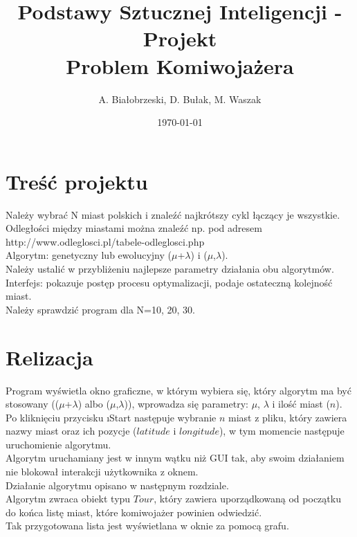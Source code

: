 \documentclass[11pt]{article}
\title{Podstawy Sztucznej Inteligencji - Projekt \\ \large Problem Komiwojażera}
\author{A. Białobrzeski, D. Bułak, M. Waszak}
\date{\today}
\begin{document}
\maketitle

\section{Treść projektu}
Należy wybrać N miast polskich i znaleźć najkrótszy cykl łączący je wszystkie.\\
Odległości między miastami można znaleźć np. pod adresem
http://www.odleglosci.pl/tabele-odleglosci.php\\
Algorytm: genetyczny lub ewolucyjny ($\mu$+$\lambda$) i ($\mu$,$\lambda$).\\Należy ustalić w przybliżeniu najlepsze parametry działania obu algorytmów.\\
Interfejs: pokazuje postęp procesu optymalizacji, podaje ostateczną kolejność miast.\\
Należy sprawdzić program dla N=10, 20, 30. 


\section{Relizacja}
Program wyświetla okno graficzne, w którym wybiera się, który algorytm ma być stosowany (($\mu$+$\lambda$) albo ($\mu$,$\lambda$)), wprowadza się parametry: $\mu$, $\lambda$ i ilość miast ($n$). Po kliknięciu przycisku \i{Start} następuje wybranie $n$ miast z pliku, który zawiera nazwy miast oraz ich pozycje ($latitude$ i $longitude$), w tym momencie następuje uruchomienie algorytmu.\\
Algorytm uruchamiany jest w innym wątku niż GUI tak, aby swoim działaniem nie blokował interakcji użytkownika z oknem.\\
Działanie algorytmu opisano w następnym rozdziale.\\
Algorytm zwraca obiekt typu $Tour$, który zawiera uporządkowaną od początku do końca listę miast, które komiwojażer powinien odwiedzić.\\
Tak przygotowana lista jest wyświetlana w oknie za pomocą grafu.
\end{document}
